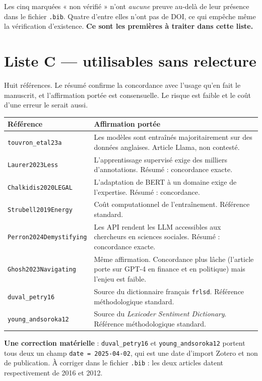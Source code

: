 \documentclass[11pt,a4paper]{article}
\newcommand{\cle}[1]{\texttt{\small #1}}
\begin{document}
\noindent Les cinq marquées « non vérifié » n'ont \emph{aucune} preuve au-delà
de leur présence dans le fichier \cle{.bib}. Quatre d'entre elles n'ont pas de
DOI, ce qui empêche même la vérification d'existence. \textbf{Ce sont les
premières à traiter dans cette liste.}

\section{Liste C --- utilisables sans relecture}

Huit références. Le résumé confirme la concordance avec l'usage qu'en fait le
manuscrit, et l'affirmation portée est consensuelle. Le risque est faible et le
coût d'une erreur le serait aussi.

\begin{center}
\begin{tabular}{@{}p{3.6cm}p{11.2cm}@{}}
\toprule
\textbf{Référence} & \textbf{Affirmation portée} \\
\midrule
\cle{touvron\_etal23a} & Les modèles sont entraînés majoritairement sur des
données anglaises. Article Llama, non contesté. \\
\cle{Laurer2023Less} & L'apprentissage supervisé exige des milliers
d'annotations. Résumé : concordance exacte. \\
\cle{Chalkidis2020LEGAL} & L'adaptation de BERT à un domaine exige de
l'expertise. Résumé : concordance. \\
\cle{Strubell2019Energy} & Coût computationnel de l'entraînement. Référence
standard. \\
\cle{Perron2024Demystifying} & Les API rendent les LLM accessibles aux
chercheurs en sciences sociales. Résumé : concordance exacte. \\
\cle{Ghosh2023Navigating} & Même affirmation. Concordance plus lâche
(l'article porte sur GPT-4 en finance et en politique) mais l'enjeu est
faible. \\
\cle{duval\_petry16} & Source du dictionnaire français \cle{frlsd}.
Référence méthodologique standard. \\
\cle{young\_andsoroka12} & Source du \emph{Lexicoder Sentiment Dictionary}.
Référence méthodologique standard. \\
\bottomrule
\end{tabular}
\end{center}

\medskip
\noindent\textbf{Une correction matérielle} : \cle{duval\_petry16} et
\cle{young\_andsoroka12} portent tous deux un champ \cle{date = 2025-04-02},
qui est une date d'import Zotero et non de publication. À corriger dans le
fichier \cle{.bib} : les deux articles datent respectivement de 2016 et 2012.
\end{document}
